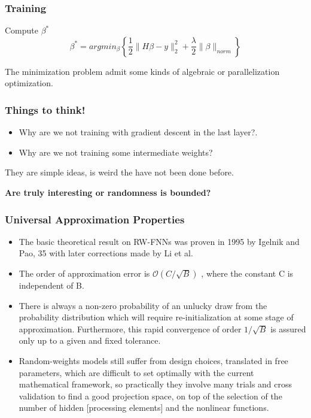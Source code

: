 \begin{frame}
    \frametitle{Training}
    Compute $\beta^*$
    \begin{equation}
        \beta^*
        = 
        arg min_{\beta}
        \left\{
            \frac{1}{2}
            \|H \beta - y\|^2_2
            +
            \frac{\lambda}{2}
            \|\beta\|_{norm}
        \right\}
    \end{equation}

    The minimization problem admit some kinds of algebraic or parallelization optimization. 
\end{frame}
\begin{frame}
    \frametitle{Things to think!}
\begin{itemize}
    \item Why are we not training with gradient descent in the last layer?. 
    \item Why are we not training some intermediate weights?
\end{itemize}
    They are simple ideas, is weird the have not been done before. 

    \textbf{
    Are truly interesting or randomness is bounded?}

\end{frame}
\begin{frame}
    \frametitle{Universal Approximation Properties}

    \begin{itemize}
        \item The basic theoretical result on RW-FNNs was
        proven in 1995 by Igelnik and Pao, 35 with later corrections made by Li et al. 

        \item  The order of
        approximation error is $\mathcal O(C/\sqrt{B})$ , where the constant C is independent of B.

        \item There is
        always a non-zero probability of an unlucky draw
        from the probability distribution which will require
        re-initialization at some stage of approximation. Furthermore, this rapid convergence of order $1/\sqrt{B}$
        is assured only up to a given and fixed tolerance.

        \item Random-weights models
        still suffer from design choices, translated in free
        parameters, which are difficult to set optimally with
        the current mathematical framework, so practically
        they involve many trials and cross validation to find
        a good projection space, on top of the selection of
        the number of hidden [processing elements] and the
        nonlinear functions.
    \end{itemize}

\end{frame}


